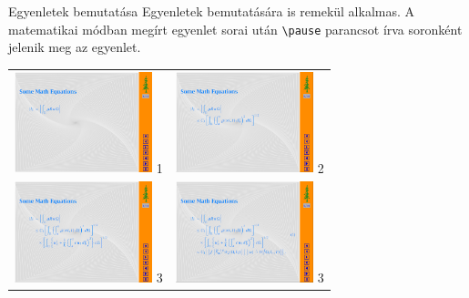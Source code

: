 \documentclass{beamer}
\begin{document}
\begin{frame}[fragile]{Egyenletek bemutatása}
 Egyenletek bemutatására is remekül alkalmas. A matematikai módban megírt egyenlet sorai után \color{red}\verb|\pause| \color{black}parancsot írva soronként jelenik meg az egyenlet. \\
\begin{tabular}{cc}
\includegraphics[width=4cm]{egyen1} 1 & \includegraphics[width=4cm]{egyen2} 2 \\
\includegraphics[width=4cm]{egyen3} 3 & \includegraphics[width=4cm]{egyen4} 3 \\ 
\end{tabular}

\end{frame}
\end{document}
